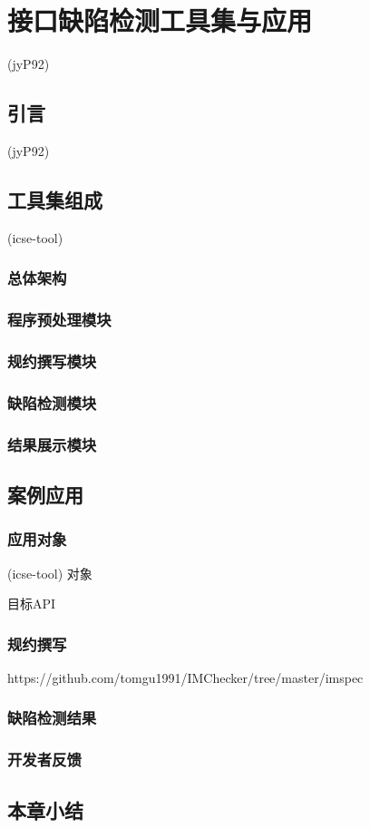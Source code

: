 \chapter{接口缺陷检测工具集与应用}
\label{cha:tools}

(jyP92)

\section{引言}
(jyP92)
\section{工具集组成}
(icse-tool)
\subsection{总体架构}
\subsection{程序预处理模块}
\subsection{规约撰写模块}
\subsection{缺陷检测模块}
\subsection{结果展示模块}

\section{案例应用}
\subsection{应用对象}
(icse-tool)
对象

目标API
\subsection{规约撰写}
https://github.com/tomgu1991/IMChecker/tree/master/imspec

\subsection{缺陷检测结果}
\subsection{开发者反馈}
\section{本章小结}
